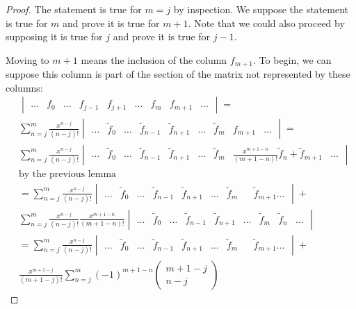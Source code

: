 \documentclass{book}
\begin{document}
\begin{proof}
The statement is true for $m=j$ by inspection.
We suppose the statement is true for $m$ and prove it is true for $m+1$.
Note that we could also proceed by supposing it is true for $j$ and prove it is true for $j-1$.

Moving to $m+1$ means the inclusion of the column $f_{m+1}$.
To begin, we can suppose this column is part of the section of the matrix not represented by these columns:
\begin{align*}
& \begin{vmatrix} \dots & f_0 & \dots & f_{j-1} & f_{j+1} & \dots & f_m & f_{m+1} & \dots \end{vmatrix} = \\
& \sum_{n=j}^m \frac{x^{n-j}}{(n-j)!} \begin{vmatrix} \dots & \tilde{f}_0 & \dots & \tilde{f}_{n-1} & \tilde{f}_{n+1} & \dots & \tilde{f}_m & f_{m+1} & \dots \end{vmatrix} = \\
& \sum_{n=j}^m \frac{x^{n-j}}{(n-j)!} \begin{vmatrix} \dots & \tilde{f}_0 & \dots & \tilde{f}_{n-1} & \tilde{f}_{n+1} & \dots & \tilde{f}_m & \frac{x^{m+1-n}}{(m+1-n)!} \tilde{f}_n + \tilde{f}_{m+1} & \dots \end{vmatrix} \\
& \text{by the previous lemma} \\
& = \sum_{n=j}^m \frac{x^{n-j}}{(n-j)!} \begin{vmatrix} \dots & \tilde{f}_0 & \dots & \tilde{f}_{n-1} & \tilde{f}_{n+1} & \dots & \tilde{f}_m & & \tilde{f}_{m+1} \dots \end{vmatrix} + \\
& \sum_{n=j}^m \frac{x^{n-j}}{(n-j)!} \frac{x^{m+1-n}}{(m+1-n)!} \begin{vmatrix} \dots & \tilde{f}_0 & \dots & \tilde{f}_{n-1} & \tilde{f}_{n+1} & \dots & \tilde{f}_m & \tilde{f}_n & \dots \end{vmatrix} \\
& = \sum_{n=j}^m \frac{x^{n-j}}{(n-j)!} \begin{vmatrix} \dots & \tilde{f}_0 & \dots & \tilde{f}_{n-1} & \tilde{f}_{n+1} & \dots & \tilde{f}_m & & \tilde{f}_{m+1} \dots \end{vmatrix} + \\
&  \frac{x^{m+1-j}}{(m+1-j)!} \sum_{n=j}^m (-1)^{m+1-n} \begin{pmatrix} m+1-j \\ n-j \end{pmatrix}

\end{align*}
\end{proof}
\end{document}
